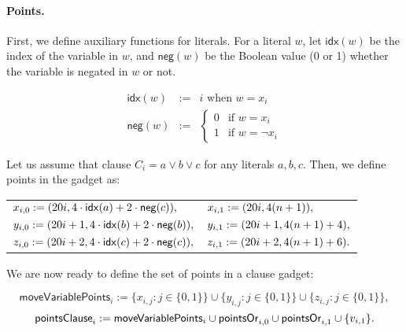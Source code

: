 \paragraph{Points.}

\newcommand{\pointsClause}[1]{\mathsf{pointsClause}_{#1}}
\newcommand{\negate}{\mathsf{neg}}
\newcommand{\idx}{\mathsf{idx}}


First, we define auxiliary functions for literals. 
For a literal $w$, let $\idx(w)$ be the index of the variable in $w$,
and $\negate(w)$ be the Boolean value (0 or 1) whether the variable is negated in $w$
or not.

\begin{eqnarray*}
\idx(w) & := &  i \text{ when } w = x_i \\
\negate(w) & := & 
\begin{cases}
 0 & \text{if } w = x_i \\
 1 & \text{if } w = \neg x_i
\end{cases}
\end{eqnarray*}

Let us assume that clause $C_i = a \lor b \lor c$
for any literals $a,b,c$. Then, we define points in the gadget as:

\begin{center}
\begin{tabular}{ l l }
	$x_{i, 0} := (\clauseXFactor i, 4\cdot \idx(a) + 2\cdot \negate(c)),$ &
	$x_{i, 1} := (20 i, 4(n+1)),$ \\
	$y_{i, 0} := (\clauseXFactor i+1, 4\cdot \idx(b) + 2\cdot \negate(b)),$ &
	$y_{i, 1} := (20 i+1, 4(n+1) + 4),$ \\
	$z_{i, 0} := (\clauseXFactor i+2, 4\cdot \idx(c) + 2\cdot \negate(c)),$ &
	$z_{i, 1} := (20 i+2, 4(n+1) + 6).$
\end{tabular}
\end{center}

\newcommand{\segmentsClause}{\mathsf{segmentsClause}}	
\newcommand{\moveVariablePoints}[1]{\mathsf{moveVariablePoints}_{#1}}
\newcommand{\moveVariableSegments}[1]{\mathsf{moveVariableSegments}_{#1}}
 
We are now ready to define the set of points in a clause gadget:
 
 $$\moveVariablePoints{i} := 
 \{x_{i, j} : j \in \{0, 1\}\} \cup
 \{y_{i, j} : j \in \{0, 1\}\} \cup
 \{z_{i, j} : j \in \{0, 1\}\},
 $$
 $$\pointsClause{i} := 
 \moveVariablePoints{i} \cup \pointsOr{i}{0}
 \cup \pointsOr{i}{1} \cup \{v_{i, 1} \}.
 $$
 
